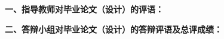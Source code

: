 
% 		

{
    
	{
        \bfseries {}
        \noindent 一、指导教师对毕业论文（设计）的评语：\\
    }
    {
    }
	\vskip 20mm

    {
        \bfseries {}
        \signature{指导教师（签名）}
    }
    {
        \bfseries {}
        \noindent 二、答辩小组对毕业论文（设计）的答辩评语及总评成绩：\\
    }
    {
    }
	\mbox{} \vfill

	{
		\bfseries
		\finaleval[~][~][~][~][~]

		\signature{负责人（签名）}
	}
}
